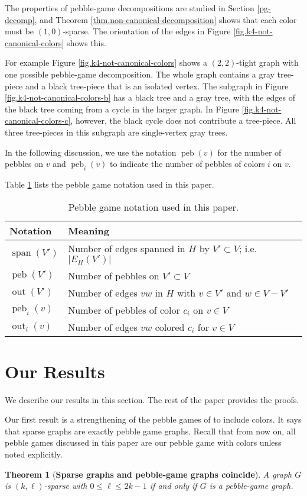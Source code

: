 \documentclass[Svgc,nospthms]{Svgc}
\newcommand{\reffig}[1]{Figure \ref{fig.#1}}
\newcommand{\card}[1]{\ensuremath{\left\vert #1 \right\vert}}
\newtheorem{theorem}{Theorem}
\newcommand{\refthm}[1]{Theorem \ref{thm.#1}}
\newcommand{\labelthm}[1]{\label{thm.#1}}
\newcommand{\peb}{\ensuremath{\operatorname{peb}}}
\newcommand{\grsp}{\ensuremath{\operatorname{span}}}
\newcommand{\out}{\ensuremath{\operatorname{out}}}
\begin{document}
	The properties of pebble-game decompositions are studied in Section \ref{pg-decomp},
	and \refthm{non-canonical-decomposition} shows that each color must be $(1,0)$-sparse.
	The orientation of the edges in \reffig{k4-not-canonical-colors} shows 
	this.
	
	For example \reffig{k4-not-canonical-colors} shows a $(2,2)$-tight graph with one 
	possible pebble-game decomposition.  The whole graph contains a gray tree-piece and a
	black tree-piece that is an isolated vertex.  The subgraph in \reffig{k4-not-canonical-colors-b}
	has a black tree and a gray tree, with the edges of the black tree coming from a cycle in the larger
	graph.  In \reffig{k4-not-canonical-colors-c}, however, the black cycle does not contribute a 
	tree-piece.  All three tree-pieces in this subgraph are single-vertex gray trees.
	
	
In the following discussion, we use the notation
$\peb(v)$ for the number of pebbles on $v$ and $\peb_i(v)$
to indicate the number of pebbles of colors $i$ on $v$.

Table \ref{tab.pebble-notations} lists the pebble game notation used in this paper.
\begin{table}
	\begin{tabular}
		{|l|l|} \hline {\bf Notation} & {\bf Meaning} \\
		\hline \hline
		$\grsp (V')$ & Number of edges spanned in $H$ by $V'\subset V$; i.e. $\card{E_{H}(V')}$\\
		\hline $\peb (V')$ &Number of pebbles on $V'\subset V$ \\
		\hline $\out (V')$ & Number of edges $vw$ in $H$ with $v\in V'$ and $w\in V-V'$ \\
		\hline $\peb_{i} (v)$ &Number of pebbles of color $c_{i}$ on $v\in V$ \\
		\hline $\out_{i} (v)$ & Number of edges $vw$ colored $c_i$ for $v\in V$ \\
		\hline
	\end{tabular}
	\caption{Pebble game notation used in this paper.} 
	\label{tab.pebble-notations} 
\end{table}


\section{Our Results} We describe our results in this section. 
The rest of the paper provides the proofs.

Our first result is a strengthening of the pebble games of \cite{pebblegame} 
to include colors.  It says that sparse graphs are exactly pebble game 
graphs.  Recall that from now on, all pebble games discussed in this 
paper are our pebble game with colors unless noted explicitly.
\begin{theorem}[{\bf Sparse graphs and pebble-game graphs coincide}]
\labelthm{sparse-graphs-are-pebble-graphs}
A graph $G$  is $(k,\ell)$-sparse  with $0\le\ell\le 2k-1$ if and only if $G$ is a pebble-game graph.
\end{theorem}
	
\end{document}
